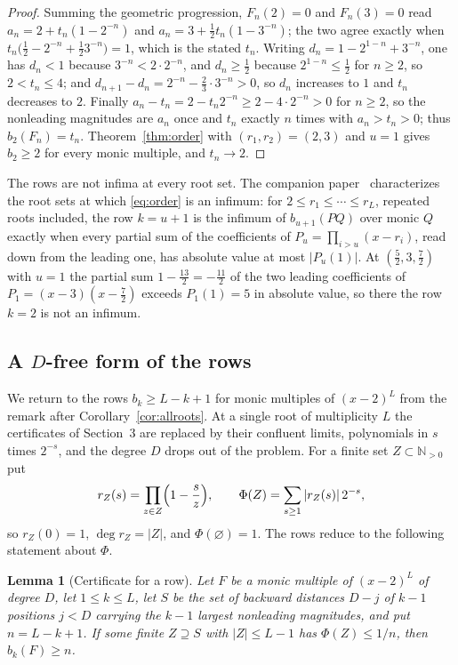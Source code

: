 \documentclass[11pt]{article}
\newtheorem{lemma}[theorem]{Lemma}
\newcommand{\N}{\mathbb N}
\begin{document}
\begin{proof}
Summing the geometric progression, $F_n(2)=0$ and $F_n(3)=0$ read
$a_n=2+t_n(1-2^{-n})$ and $a_n=3+\tfrac12t_n(1-3^{-n})$; the two agree exactly
when $t_n\bigl(\tfrac12-2^{-n}+\tfrac123^{-n}\bigr)=1$, which is the stated
$t_n$.  Writing $d_n=1-2^{1-n}+3^{-n}$, one has $d_n<1$ because
$3^{-n}<2\cdot2^{-n}$, and $d_n\ge\tfrac12$ because $2^{1-n}\le\tfrac12$ for
$n\ge2$, so $2<t_n\le4$; and
$d_{n+1}-d_n=2^{-n}-\tfrac23\cdot3^{-n}>0$, so $d_n$ increases to $1$ and
$t_n$ decreases to $2$.  Finally $a_n-t_n=2-t_n2^{-n}\ge2-4\cdot2^{-n}>0$ for
$n\ge2$, so the nonleading magnitudes are $a_n$ once and $t_n$ exactly $n$
times with $a_n>t_n>0$; thus $b_2(F_n)=t_n$.  Theorem~\ref{thm:order} with
$(r_1,r_2)=(2,3)$ and $u=1$ gives $b_2\ge2$ for every monic multiple, and
$t_n\to2$.
\end{proof}

The rows are not infima at every root set.  The companion
paper~\cite{coefficient-mass-attainment} characterizes the root sets at
which \eqref{eq:order} is an infimum: for $2\le r_1\le\cdots\le r_L$,
repeated roots included, the row $k=u+1$ is the infimum of $b_{u+1}(PQ)$
over monic $Q$ exactly when every partial sum of the coefficients of
$P_u=\prod_{i>u}(x-r_i)$, read down from the leading one, has absolute value
at most $|P_u(1)|$.  At $(\tfrac52,3,\tfrac72)$ with $u=1$ the
partial sum $1-\tfrac{13}2=-\tfrac{11}2$ of the two leading coefficients of
$P_1=(x-3)(x-\tfrac72)$ exceeds $P_1(1)=5$ in absolute value, so there the row $k=2$ is not an infimum.

\subsection{A \texorpdfstring{$D$}{D}-free form of the rows}

We return to the rows $b_k\ge L-k+1$ for monic multiples of
$(x-2)^L$ from the remark after Corollary~\ref{cor:allroots}.  At a
single root of multiplicity $L$ the certificates of Section~3 are replaced
by their confluent limits, polynomials in $s$ times $2^{-s}$, and the
degree $D$ drops out of the problem.  For a finite set $Z\subset\N_{>0}$ put
\[
  r_Z(s)=\prod_{z\in Z}\Bigl(1-\frac sz\Bigr),\qquad
  \Phi(Z)=\sum_{s\ge1}|r_Z(s)|\,2^{-s},
\]
so $r_Z(0)=1$, $\deg r_Z=|Z|$, and $\Phi(\varnothing)=1$.  The rows reduce to
the following statement about $\Phi$.

\begin{lemma}[Certificate for a row]\label{lem:rowcert}
Let $F$ be a monic multiple of $(x-2)^L$ of degree $D$, let $1\le k\le L$,
let $S$ be the set of backward distances $D-j$ of $k-1$ positions $j<D$
carrying the $k-1$ largest nonleading magnitudes, and put $n=L-k+1$.  If
some finite $Z\supseteq S$ with $|Z|\le L-1$ has $\Phi(Z)\le1/n$, then
$b_k(F)\ge n$.
\end{lemma}
\end{document}
